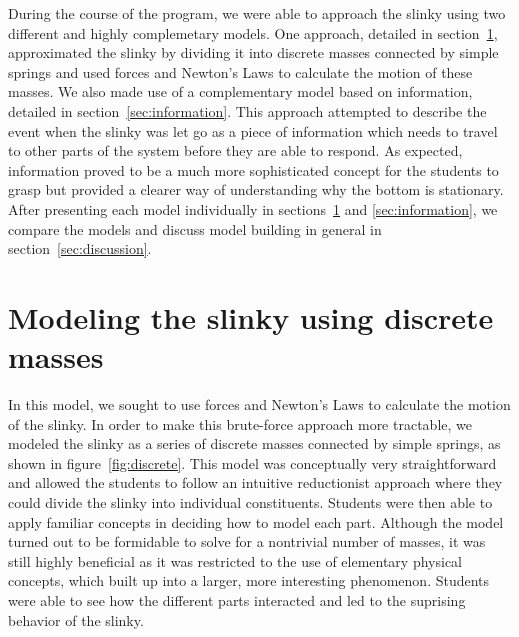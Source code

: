 \documentclass[prb,preprint]{revtex4-1}
\renewcommand{\sec}[1]{section~\ref{sec:#1}}
\newcommand{\secs}[2]{sections~\ref{sec:#1} and \ref{sec:#2}}
\newcommand{\subsec}[1]{section~\ref{subsec:#1}}
\newcommand{\fig}[1]{figure~\ref{fig:#1}}
\begin{document}
During the course of the program, we were able to approach the slinky using two different
and highly complemetary models.
One approach, detailed in \sec{forces}, approximated
the slinky by dividing it into discrete masses connected by simple springs and used
forces and Newton's Laws to calculate the motion of these masses.
We also made use of a complementary
model based on information, detailed in \sec{information}. This approach attempted
to describe the event when the slinky was let go as a piece of information which
needs to travel to other parts of the system before they are able to respond.
As expected, information proved to be a much more sophisticated concept for the
students to grasp but provided a clearer way of understanding why the bottom
is stationary. After presenting each
model individually in \secs{forces}{information}, we compare the models and
discuss model building in general in \sec{discussion}.

\section{Modeling the slinky using discrete masses}
\label{sec:forces}

In this model, we sought to use forces and Newton's Laws to calculate the
motion of the slinky. In order to make this brute-force approach more tractable, we
modeled the slinky as a series of discrete masses connected by simple springs, as
shown in \fig{discrete}. This
model was conceptually very straightforward and allowed the students to follow an
intuitive reductionist approach where they could divide the slinky into individual
constituents. Students were then able to apply familiar concepts in deciding how to model each part. Although the model turned out to
be formidable to solve for a nontrivial number of masses, it was still highly beneficial as it was restricted to the
use of elementary physical concepts, which built up into a larger, more interesting
phenomenon. Students were able to see how the different parts interacted and led
to the suprising behavior of the slinky.


\end{document}
